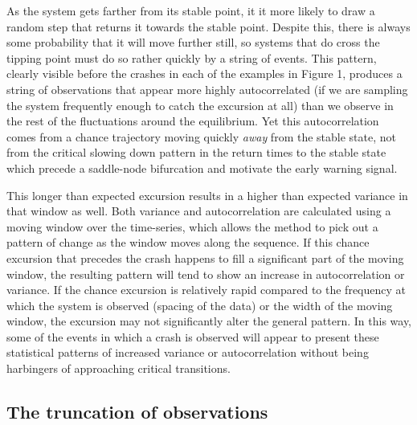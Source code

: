 \documentclass[authoryear,review,12pt]{elsarticle}
\begin{document}
As the system gets farther from its stable point, it it more likely to
draw a random step that returns it towards the stable point. Despite
this, there is always some probability that it will move further still,
so systems that do cross the tipping point must do so rather quickly by
a string of events.  This pattern, clearly visible before the crashes
in each of the examples in Figure 1, produces a string of observations
that appear more highly autocorrelated (if we are sampling the system
frequently enough to catch the excursion at all) than we observe in the
rest of the fluctuations around the equilibrium.  Yet this autocorrelation
comes from a chance trajectory moving quickly \emph{away} from the
stable state, not from the critical slowing down pattern in the return
times to the stable state which precede a saddle-node bifurcation and
motivate the early warning signal.


This longer than expected excursion results in a higher than expected
variance in that window as well. Both variance and autocorrelation are
calculated using a moving window over the time-series, which allows
the method to pick out a pattern of change as the window moves along
the sequence. If this chance excursion that precedes the crash happens
to fill a significant part of the moving window, the resulting pattern
will tend to show an increase in autocorrelation or variance.  If the
chance excursion is relatively rapid compared to the frequency at which
the system is observed (spacing of the data) or the width of the moving
window, the excursion may not significantly alter the general pattern.
In this way, some of the events in which a crash is observed will
appear to present these statistical patterns of increased variance
or autocorrelation without being harbingers of approaching critical
transitions.


\subsection{ The truncation of observations }
\end{document}
